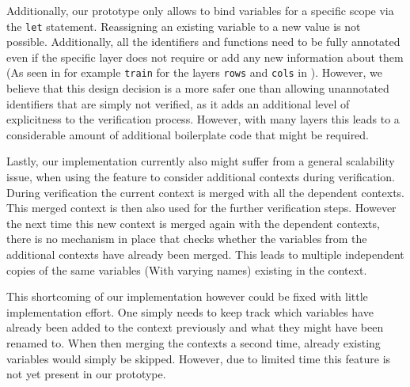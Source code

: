 Additionally, our prototype only allows to bind variables for a specific scope via the \texttt{let} statement. Reassigning an existing variable to a new value is not possible. Additionally, all the identifiers and functions need to be fully annotated even if the specific layer does not require or add any new information about them (As seen in for example \texttt{train} for the layers \texttt{rows} and \texttt{cols} in ). However, we believe that this design decision is a more safer one than allowing unannotated identifiers that are simply not verified, as it adds an additional level of explicitness to the verification process. However, with many layers this leads to a considerable amount of additional boilerplate code that might be required.

Lastly, our implementation currently also might suffer from a general scalability issue, when using the feature to consider additional contexts during verification. During verification the current context is merged with all the dependent contexts. This merged context is then also used for the further verification steps. However the next time this new context is merged again with the dependent contexts, there is no mechanism in place that checks whether the variables from the additional contexts have already been merged. This leads to multiple independent copies of the same variables (With varying names) existing in the context.

This shortcoming of our implementation however could be fixed with little implementation effort. One simply needs to keep track which variables have already been added to the context previously and what they might have been renamed to. When then merging the contexts a second time, already existing variables would simply be skipped. However, due to limited time this feature is not yet present in our prototype.
